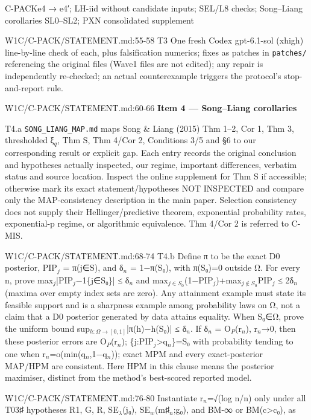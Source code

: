 \begin{card}{C-PACK}{e4 → e4′; LH-iid without candidate inputs; SEL/L8 checks; Song–Liang corollaries SL0–SL2; PXN consolidated supplement}
\begin{stmt}{W1C/C-PACK/STATEMENT.md:55-58}
T3 One fresh Codex gpt-6.1-sol (xhigh) line-by-line check of each, plus falsification numerics; fixes as patches in
\texttt{patches/} referencing the original files (Wave1 files are not edited); any repair is independently re-checked; an actual
counterexample triggers the protocol's stop-and-report rule.
\end{stmt}
\begin{stmt}{W1C/C-PACK/STATEMENT.md:60-66}
\textbf{Item 4 — Song–Liang corollaries}

T4.a \texttt{SONG\_LIANG\_MAP.md} maps Song \& Liang (2015) Thm 1–2, Cor 1, Thm 3, thresholded ξ$_{q}$, Thm S, Thm 4/Cor 2, Conditions
3/5 and §6 to our corresponding result or explicit gap. Each entry records the original conclusion and hypotheses actually
inspected, our regime, important differences, verbatim status and source location. Inspect the online supplement for
Thm S if accessible; otherwise mark its exact statement/hypotheses NOT INSPECTED and compare only the MAP-consistency
description in the main paper. Selection consistency does not supply their Hellinger/predictive theorem, exponential
probability rates, exponential-p regime, or algorithmic equivalence. Thm 4/Cor 2 is referred to C-MIS.
\end{stmt}
\begin{stmt}{W1C/C-PACK/STATEMENT.md:68-74}
T4.b Define π to be the exact D0 posterior, PIP$_{j}$ = π(j∈S), and δ$_{n}$ = 1−π(S₀), with π(S₀)=0 outside Ω. For every n, prove
max$_{j}$|PIP$_{j}$−1\{j∈S₀\}| ≤ δ$_{n}$ and max$_{j\in S_{0}}$(1−PIP$_{j}$)+max$_{j\notin S_{0}}$PIP$_{j}$ ≤ 2δ$_{n}$ (maxima over empty index sets are zero). Any
attainment example must state its feasible support and is a sharpness example among probability laws on Ω, not a claim
that a D0 posterior generated by data attains equality. When S₀∈Ω, prove the uniform bound sup$_{h:\Omega\to[0,1]}$|π(h)−h(S₀)| ≤
δ$_{n}$. If δ$_{n}$ = O$_{P}$(r$_{n}$), r$_{n}$→0, then these posterior errors are O$_{P}$(r$_{n}$); \{j:PIP$_{j}$>q$_{n}$\}=S₀ with probability tending to one
when r$_{n}$=o(min(q$_{n}$,1−q$_{n}$)); exact MPM and every exact-posterior MAP/HPM are consistent. Here HPM in this clause means the
posterior maximiser, distinct from the method's best-scored reported model.
\end{stmt}
\begin{stmt}{W1C/C-PACK/STATEMENT.md:76-80}
Instantiate r$_{n}$=√(log n/n) only under all T03♯ hypotheses R1, G, R, SE$_{\lambda}$(j₀), SE$_{w}$(m♯$_{n}$;g₀), and BM-∞ or BM(c>c₀), as

\end{stmt}
\end{card}
